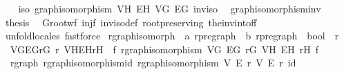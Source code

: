 \begin{isabellebody}
%
\isadelimproof
%
\endisadelimproof
%
\isatagproof
{}\isamarkupfalse%
{\isacharminus}{\kern0pt}\isanewline
\ \ \isamarkupfalse%
\ iso{\isacharcolon}{\kern0pt}\ graph{\isacharunderscore}{\kern0pt}isomorphism\ V\isactrlsub H\ E\isactrlsub H\ V\isactrlsub G\ E\isactrlsub G\ inv{\isacharunderscore}{\kern0pt}iso\ \isamarkupfalse%
\ graph{\isacharunderscore}{\kern0pt}isomorphism{\isacharunderscore}{\kern0pt}inv\ \isacommand{{\isachardot}{\kern0pt}}\isamarkupfalse%
\isanewline
\ \ \isamarkupfalse%
\ {\isacharquery}{\kern0pt}thesis\ \isamarkupfalse%
\ G{\isachardot}{\kern0pt}root{\isacharunderscore}{\kern0pt}wf\ inj{\isacharunderscore}{\kern0pt}f\ inv{\isacharunderscore}{\kern0pt}iso{\isacharunderscore}{\kern0pt}def\ root{\isacharunderscore}{\kern0pt}preserving\ the{\isacharunderscore}{\kern0pt}inv{\isacharunderscore}{\kern0pt}into{\isacharunderscore}{\kern0pt}f{\isacharunderscore}{\kern0pt}f\isanewline
\ \ \ \ \isamarkupfalse%
\ unfold{\isacharunderscore}{\kern0pt}locales\ fastforce\isanewline
{}\isamarkupfalse%
%
\endisatagproof
{\isafoldproof}%
%
\isadelimproof
\isanewline
%
\endisadelimproof
\isanewline
{}\isamarkupfalse%
\isanewline
\isanewline
{}\isamarkupfalse%
\ rgraph{\isacharunderscore}{\kern0pt}isomorph\ {\isacharcolon}{\kern0pt}{\isacharcolon}{\kern0pt}\ {\isachardoublequoteopen}{\isacharprime}{\kern0pt}a\ rpregraph\ {\isasymRightarrow}\ {\isacharprime}{\kern0pt}b\ rpregraph\ {\isasymRightarrow}\ bool{\isachardoublequoteclose}\ {\isacharparenleft}{\kern0pt}\ {\isachardoublequoteopen}{\isasymsimeq}\isactrlsub r{\isachardoublequoteclose}\ {}{}{\isacharparenright}{\kern0pt}\ \isanewline
\ \ {\isachardoublequoteopen}{\isacharparenleft}{\kern0pt}V\isactrlsub G{\isacharcomma}{\kern0pt}E\isactrlsub G{\isacharcomma}{\kern0pt}r\isactrlsub G{\isacharparenright}{\kern0pt}\ {\isasymsimeq}\isactrlsub r\ {\isacharparenleft}{\kern0pt}V\isactrlsub H{\isacharcomma}{\kern0pt}E\isactrlsub H{\isacharcomma}{\kern0pt}r\isactrlsub H{\isacharparenright}{\kern0pt}\ {\isasymlongleftrightarrow}\ {\isacharparenleft}{\kern0pt}{\isasymexists}f{\isachardot}{\kern0pt}\ rgraph{\isacharunderscore}{\kern0pt}isomorphism\ V\isactrlsub G\ E\isactrlsub G\ r\isactrlsub G\ V\isactrlsub H\ E\isactrlsub H\ r\isactrlsub H\ f{\isacharparenright}{\kern0pt}{\isachardoublequoteclose}\isanewline
\isanewline
{}\isamarkupfalse%
\ {\isacharparenleft}{\kern0pt}\ rgraph{\isacharparenright}{\kern0pt}\ rgraph{\isacharunderscore}{\kern0pt}isomorphism{\isacharunderscore}{\kern0pt}id{\isacharcolon}{\kern0pt}\ {\isachardoublequoteopen}rgraph{\isacharunderscore}{\kern0pt}isomorphism\ V\ E\ r\ V\ E\ r\ id{\isachardoublequoteclose}\isanewline

\end{isabellebody}
